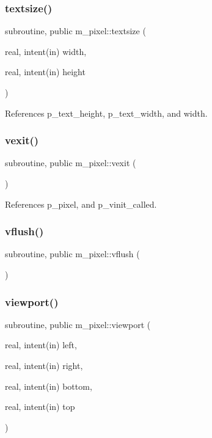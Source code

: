 \subsubsection{\texorpdfstring{textsize()}{textsize()}}
{\footnotesize\ttfamily subroutine, public m\+\_\+pixel\+::textsize (\begin{DoxyParamCaption}\item[{real, intent(in)}]{width,  }\item[{real, intent(in)}]{height }\end{DoxyParamCaption})}



References p\+\_\+text\+\_\+height, p\+\_\+text\+\_\+width, and width.

\mbox{\label{namespacem__pixel_a19ad6b65752322b0029a62cc0ebec3e8}} 
\subsubsection{\texorpdfstring{vexit()}{vexit()}}
{\footnotesize\ttfamily subroutine, public m\+\_\+pixel\+::vexit (\begin{DoxyParamCaption}{ }\end{DoxyParamCaption})}



References p\+\_\+pixel, and p\+\_\+vinit\+\_\+called.

\mbox{\label{namespacem__pixel_ae74cf11194379dbf13069a61b06589a2}} 
\subsubsection{\texorpdfstring{vflush()}{vflush()}}
{\footnotesize\ttfamily subroutine, public m\+\_\+pixel\+::vflush (\begin{DoxyParamCaption}{ }\end{DoxyParamCaption})}

\mbox{\label{namespacem__pixel_a43247343cd316e3aa075b44b5166e2e9}} 
\subsubsection{\texorpdfstring{viewport()}{viewport()}}
{\footnotesize\ttfamily subroutine, public m\+\_\+pixel\+::viewport (\begin{DoxyParamCaption}\item[{real, intent(in)}]{left,  }\item[{real, intent(in)}]{right,  }\item[{real, intent(in)}]{bottom,  }\item[{real, intent(in)}]{top }\end{DoxyParamCaption})}



